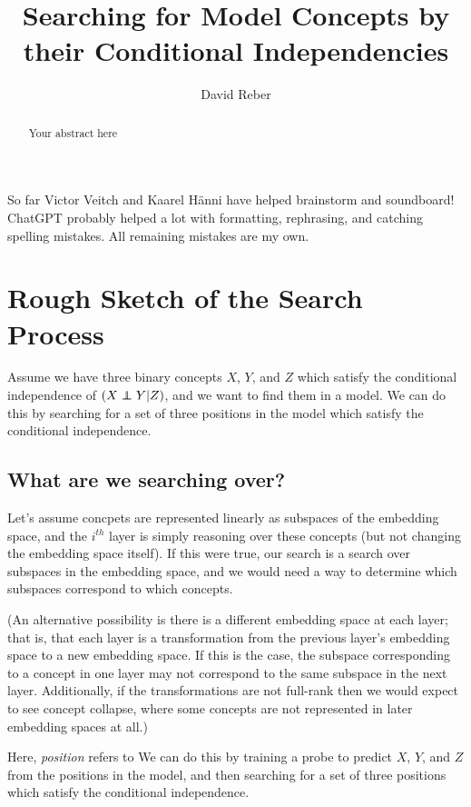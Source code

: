 \documentclass{article}
\title{Searching for Model Concepts by their Conditional Independencies}
\date{}
\author[1]{David Reber}
\begin{document}
\maketitle

\begin{abstract}
Your abstract here
\end{abstract}

So far Victor Veitch and Kaarel Hänni have helped brainstorm and soundboard! ChatGPT probably helped a lot with formatting, rephrasing, and catching spelling mistakes. All remaining mistakes are my own.

\section{Rough Sketch of the Search Process}
Assume we have three binary concepts $X$, $Y$, and $Z$ which satisfy the conditional independence of $(X\independent Y|Z)$, and we want to find them in a model. We can do this by searching for a set of three positions in the model which satisfy the conditional independence. 

\subsection{What are we searching over?}
Let's assume concpets are represented linearly as subspaces of the embedding space, and the $i^{th}$ layer is simply reasoning over these concepts (but not changing the embedding space itself). If this were true, our search is a search over subspaces in the embedding space, and we would need a way to determine which subspaces correspond to which concepts.

(An alternative possibility is there is a different embedding space at each layer; that is, that each layer is a transformation from the previous layer's embedding space to a new embedding space. If this is the case, the subspace corresponding to a concept in one layer may not correspond to the same subspace in the next layer. Additionally, if the transformations are not full-rank then we would expect to see concept collapse, where some concepts are not represented in later embedding spaces at all.)

Here, \emph{position} refers to 
We can do this by training a probe to predict $X$, $Y$, and $Z$ from the positions in the model, and then searching for a set of three positions which satisfy the conditional independence.
\end{document}
